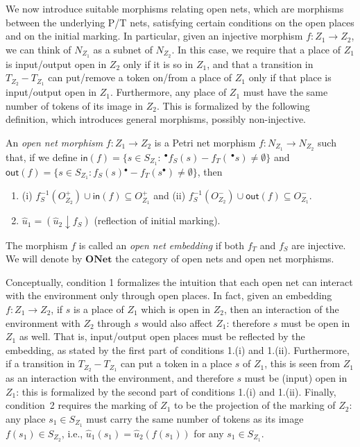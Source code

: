 \documentclass{LMCS}
\newcommand{\inp}[1]{\ensuremath{\mathsf{in}({#1})}}
\newcommand{\out}[1]{\ensuremath{\mathsf{out}({#1})}}
\newcommand{\init}[1]{\hat{#1}}
\newcommand{\res}[2]{\ensuremath{({#1}\!\downarrow\!{#2})}}
\newcommand{\pre}[1][(\cdot)]{\ensuremath{\!~^\bullet{#1}}}
\newcommand{\post}[1][(\cdot)]{\ensuremath{{#1} {^\bullet}}}
\newcommand{\onet}{\ensuremath{\mathbf{ONet}}}
\begin{document}
We now introduce suitable morphisms relating open nets, which are
morphisms between the underlying P/T nets, satisfying certain
conditions on the open places and on the initial marking. In
particular, given an injective morphism $f : Z_1 \to Z_2$, we can
think of $N_{Z_1}$ as a subnet of $N_{Z_2}$.  In this case, we require
that a place of $Z_1$ is input/output open in $Z_2$ only if 
it is so in $Z_1$, and that a transition in $T_{Z_2} - T_{Z_1}$ can
put/remove a token on/from a place of $Z_1$ only if that place is
input/output open in $Z_1$. Furthermore, any place of $Z_1$ must have
the same number of tokens of its image in $Z_2$. This is formalized
by the following definition, which introduces general morphisms,
possibly non-injective.

\begin{defi}
  \label{de:open-net-morphism}
  An \emph{open net morphism} $f : Z_1 \to Z_2$ is a Petri net
  morphism $f : N_{Z_1} \to N_{Z_2}$ such that, if we define
$\inp{f} = \{ s \in S_{Z_1} : \pre[f_S(s)] - f_T(\pre[s]) \neq
  \emptyset \}$
and
$\out{f} =  \{ s \in S_{Z_1} : \post[f_S(s)] - f_T(\post[s]) \neq
  \emptyset \}$,
then

  \begin{enumerate}[(1)]
  \item
(i) $f_S^{-1}(O_{Z_2}^+) \cup \inp{f} \subseteq O_{Z_1}^+$  and
    (ii)
    $f_S^{-1}(O_{Z_2}^-) \cup \out{f} \subseteq O_{Z_1}^-$.


  \item $\init{u}_1 = \res{\init{u}_2}{f_S}$ (reflection of initial marking).

  \end{enumerate}

  \noindent
  The morphism $f$ is called an \emph{open net embedding} if both
  $f_T$ and $f_S$ are injective.
We will denote by $\onet$ the category of open nets and
  open net morphisms.
\end{defi}




Conceptually, condition 1 formalizes the
intuition that each open net can interact with the environment only
through open places.  In fact, given an embedding $f : Z_1 \to Z_2$,
if $s$ is a place of $Z_1$ which is
open in $Z_2$, then an interaction of the environment with $Z_2$
through $s$ would also affect $Z_1$: therefore $s$ must be open in
$Z_1$ as well. That is, input/output open places must be reflected by
the embedding, as stated by the first part of conditions 1.(i) and
1.(ii).  Furthermore, if a transition in $T_{Z_2} - T_{Z_1}$ can put a
token in a place $s$ of $Z_1$, this is seen from $Z_1$ as an
interaction with the environment, and therefore $s$ must be (input)
open in $Z_1$: this is formalized by the second part of conditions
1.(i) and 1.(ii).  
Finally, condition~2 requires the marking of $Z_1$ to be the
projection of the marking of $Z_2$: any place $s_1 \in S_{Z_1}$ must
carry the same number of tokens as its image $f(s_1) \in S_{Z_2}$,
i.e., $\init{u}_1(s_1) = \init{u}_2(f(s_1))$ for any $s_1 \in
S_{Z_1}$.
\end{document}
